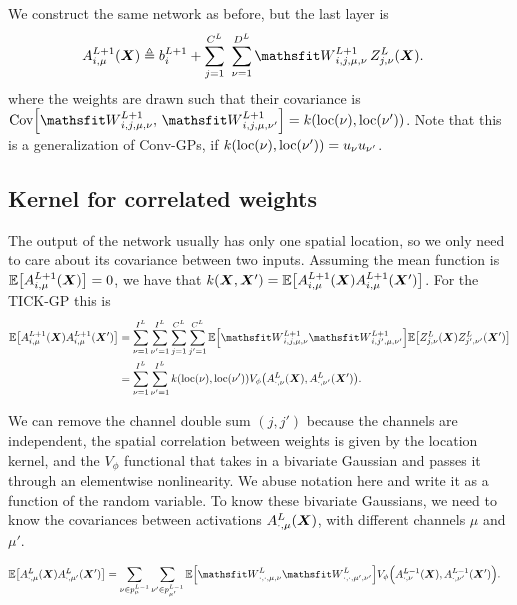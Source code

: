 \documentclass{article} %
\newcommand{\bracket}[3]{{\left#1 #3 \right#2}}
\newcommand{\bra}{\bracket{(}{)}}
\newcommand{\sqb}{\bracket{[}{]}}
\newcommand{\ssup}[1]{^{#1}}
\newcommand{\eqdef}{\triangleq}
\begin{document}
We construct the same network as before, but the last layer is
\begin{align}
\emA_{i,\mu}\ssup{L+1}(\mX) &\eqdef \evb_i\ssup{L+1} +
\sum_{j=1}^{C\ssup{L}} \ \sum_{\nu=1}^{D\ssup{L}} \etW\ssup{L+1}_{i,j,\mu,\nu}\, \emZ\ssup{L}_{j,\nu}(\mX).
\label{eq:tickgp-network-final}
\end{align}
where the weights are drawn such that their covariance is
$\Cov\sqb{\etW\ssup{L+1}_{i,j,\mu,\nu},\, \etW\ssup{L+1}_{i,j,\mu,\nu'}} =
k(\text{loc}(\nu), \text{loc}(\nu'))$. Note that this is a generalization of
Conv-GPs, if $k(\text{loc}(\nu), \text{loc}(\nu')) = {u}_\nu {u}_{\nu'}$.

\subsection{Kernel for correlated weights}

The output of the network usually has only one spatial location, so we only need to care about its covariance between two inputs. Assuming the mean function is $\E\sqb{\emA_{i,\mu}\ssup{L+1}(\mX)} = 0$, we have that $k(\mX, \mX') = \E\sqb{\emA_{i,\mu}\ssup{L+1}(\mX)\emA_{i,\mu}\ssup{L+1}(\mX')}$. For the TICK-GP this is
\begin{align}
\E\sqb{\emA_{i,\mu}\ssup{L+1}(\mX)\emA_{i,\mu}\ssup{L+1}(\mX')} &=
\sum_{\nu=1}^{I^L} \sum_{\nu'=1}^{I^L} \sum_{j=1}^{C^L} \sum_{j'=1}^{C^L} \E\sqb{\etW\ssup{L+1}_{i,j,\mu,\nu}\etW\ssup{L+1}_{i,j',\mu,\nu'}}
\E\sqb{\emZ\ssup{L}_{j,\nu}(\mX) \emZ\ssup{L}_{j',\nu'}(\mX')} \\
&= \sum_{\nu=1}^{I^L} \sum_{\nu'=1}^{I^L}k(\text{loc}(\nu), \text{loc}(\nu')) V_\phi\bra{\emA\ssup{L}_{\cdot,\nu}(\mX), \emA\ssup{L}_{\cdot,\nu'}(\mX')}.
\end{align}

We can remove the channel double sum $(j, j')$ because the channels are independent, the spatial correlation between weights is given by the location kernel, and the $V_\phi$ functional that takes in a bivariate Gaussian and passes it through an elementwise nonlinearity. We abuse notation here and write it as a function of the random variable. To know these bivariate Gaussians, we need to know the covariances between activations $\emA_{\cdot,\mu}\ssup{L}(\mX)$, with different channels $\mu$ and $\mu'$.

\begin{align}
\E\sqb{\emA_{\cdot,\mu}\ssup{L}(\mX)\emA_{\cdot,\mu'}\ssup{L}(\mX')} &=
\sum_{\nu \in p_\mu^{L-1}} \sum_{\nu'\in p_{\mu'}^{L-1}} \E\sqb{\etW\ssup{L}_{\cdot,\cdot,\mu,\nu}\etW\ssup{L}_{\cdot,\cdot,\mu',\nu'}} V_\phi\bra{\emA\ssup{L-1}_{\cdot,\nu}(\mX), \emA\ssup{L-1}_{\cdot,\nu'}(\mX')}.
\end{align}
\end{document}
